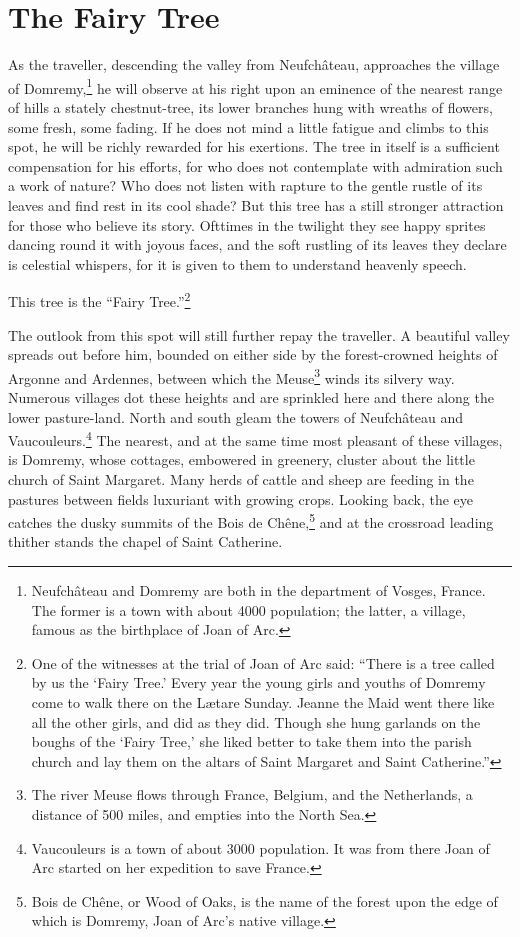 \chapter{The Fairy Tree}
\setcounter{mopagecnt}{1}

\drop As the traveller, descending the valley from Neufchâteau,
approaches the village of Domremy,\footnote{Neufchâteau and Domremy are
  both in the department of Vosges, France. The former is a town with
  about 4000 population; the latter, a village, famous as the birthplace
  of Joan of Arc.} he will observe at his right upon an eminence of the
nearest range of hills a stately chestnut-tree, its lower branches hung
with wreaths of flowers, some fresh, some fading. If he does not mind a
little fatigue and climbs to this spot, he will be richly rewarded for
his exertions. The tree in itself is a sufficient compensation for his
efforts, for who does not contemplate with admiration such a work of
nature? Who does not listen with rapture to the gentle rustle of its
leaves and find rest in its cool shade? But this tree has a still
stronger attraction for those who believe its story. Ofttimes in the
twilight they see happy sprites dancing round it with joyous faces, and
the soft rustling of its leaves they declare is celestial whispers, for
it is given to them to understand heavenly speech.

This tree is the ``Fairy Tree.''\footnote{One of the witnesses at the
  trial of Joan of Arc said: ``There is a tree called by us the `Fairy
  Tree.' Every year the young girls and youths of Domremy come to walk
  there on the Lætare Sunday. Jeanne the Maid went there like all the
  other girls, and did as they did. Though she hung garlands on the
  boughs of the `Fairy Tree,' she liked better to take them into the
  parish church and lay them on the altars of Saint Margaret and Saint
  Catherine.''}

The outlook from this spot will still further repay the traveller. A
beautiful valley spreads out before him, bounded on either side by the
forest-crowned heights of Argonne and Ardennes, between which the
Meuse\footnote{The river Meuse flows through France, Belgium, and the
  Netherlands, a distance of 500 miles, and empties into the North Sea.}
winds its silvery way. Numerous villages dot these heights and are
sprinkled here and there along the lower pasture-land. North and south
gleam the towers of Neufchâteau and Vaucouleurs.\footnote{Vaucouleurs is
  a town of about 3000 population. It was from there Joan of Arc started
  on her expedition to save France.} The nearest, and at the same time
most pleasant of these villages, is Domremy, whose cottages, embowered
in greenery, cluster about the little church of Saint Margaret. Many
herds of cattle and sheep are feeding in the pastures between fields
luxuriant with growing crops. Looking back, the eye catches the dusky
summits of the Bois de Chêne,\footnote{Bois de Chêne, or Wood of Oaks,
  is the name of the forest upon the edge of which is Domremy, Joan of
  Arc's native village.} and at the crossroad leading thither stands the
chapel of Saint Catherine.

